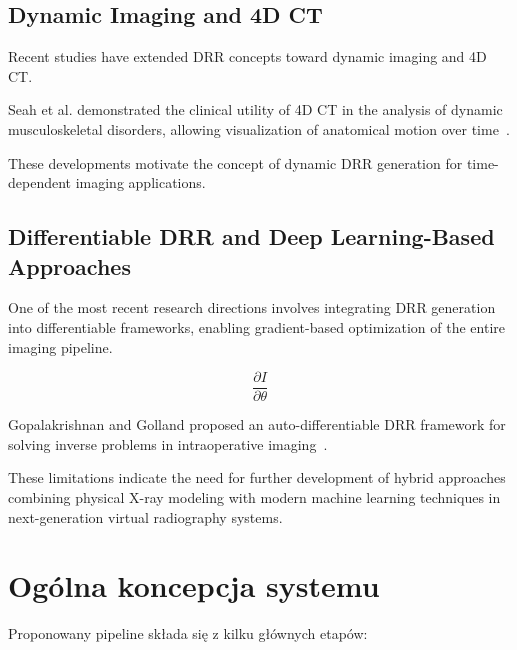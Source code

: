 \documentclass[11pt,a4paper]{article}
\begin{document}
\subsection{Dynamic Imaging and 4D CT}

Recent studies have extended DRR concepts toward dynamic imaging and 4D CT.

Seah et al. demonstrated the clinical utility of 4D CT in the analysis of dynamic musculoskeletal disorders, allowing visualization of anatomical motion over time~\cite{Seah2022}.

These developments motivate the concept of dynamic DRR generation for time-dependent imaging applications.

\subsection{Differentiable DRR and Deep Learning-Based Approaches}

One of the most recent research directions involves integrating DRR generation into differentiable frameworks, enabling gradient-based optimization of the entire imaging pipeline.

\begin{equation}
\frac{\partial I}{\partial \theta}
\end{equation}

Gopalakrishnan and Golland proposed an auto-differentiable DRR framework for solving inverse problems in intraoperative imaging~\cite{Gopalakrishnan2022}.

These limitations indicate the need for further development of hybrid approaches combining physical X-ray modeling with modern machine learning techniques in next-generation virtual radiography systems.



\section{Ogólna koncepcja systemu}

Proponowany pipeline składa się z kilku głównych etapów:
\end{document}
